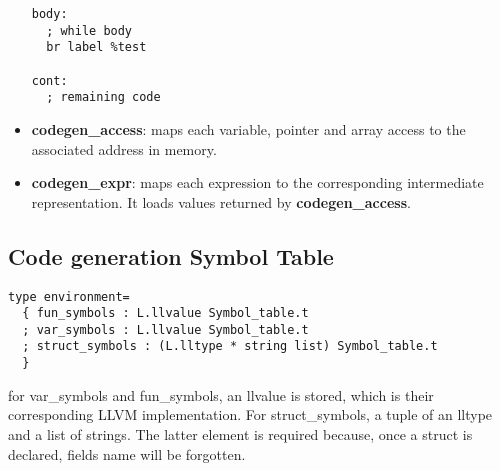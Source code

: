 \documentclass{article}
\begin{document}
\begin{itemize}
\begin{minipage}{0.45\textwidth}
\begin{verbatim}
body:
  ; while body
  br label %test

cont:
  ; remaining code

\end{verbatim}
\end{minipage}





  \item \textbf{codegen\_access}: maps each variable, pointer and array access to the associated address in memory.
  \item \textbf{codegen\_expr}: maps each expression to the corresponding intermediate representation. It loads
  values returned by \textbf{codegen\_access}.
\end{itemize}

\subsection*{Code generation Symbol Table}
\begin{lstlisting}[linewidth=13.5cm, frame=single, basicstyle=\ttfamily\fontsize{8pt}{14pt}]
type environment=
  { fun_symbols : L.llvalue Symbol_table.t
  ; var_symbols : L.llvalue Symbol_table.t
  ; struct_symbols : (L.lltype * string list) Symbol_table.t
  }
\end{lstlisting}
for var\_symbols and fun\_symbols, an llvalue is stored, which is their corresponding LLVM implementation.
For struct\_symbols, a tuple of an lltype and a list of strings. The latter element is required because, once a struct is declared,
fields name will be forgotten.
\end{document}

